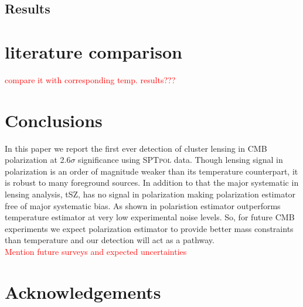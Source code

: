 \documentclass[twocolumn]{aastex61}
\newcommand{\pending}[1]{\textcolor{red}{#1}}
\newcommand{\sptpol}{\textsc{SPTpol}}
\newcommand{\howmanysigmastackedforpol}{2.6}
\begin{document}
\subsection{Results}


\section{literature comparison}
\pending{compare it with corresponding temp. results???}
\section{Conclusions}\label{sec_conclusion}
In this paper we report the first ever detection of cluster lensing in CMB polarization at \howmanysigmastackedforpol$\sigma$ significance using \sptpol{} data. Though lensing signal in polarization is an order of magnitude weaker than its temperature counterpart, it is robust to many foreground sources. In addition to that the major systematic in lensing analysis, tSZ, has no signal in polarization making polarization estimator free of major systematic bias. As shown in \citet{raghunathan17a} polaristion estimator outperforms temperature estimator at very low experimental noise levels. So, for future CMB experiments we expect polarization estimator to provide better mass constraints than temperature and our detection will act as a pathway.
\\ \pending{Mention future surveys and expected uncertainties}

\section*{Acknowledgements}
\newcommand\JCAP{JCAP}


%
{}
{}
\end{document}
